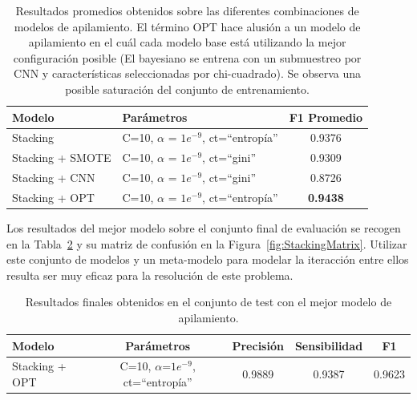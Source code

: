 \documentclass[12pt,letterpaper]{article}
\begin{document}
\begin{table}[htp]
    \centering
    \begin{tabular}{llc}
        \hline
        \textbf{Modelo} & \textbf{Parámetros} &\textbf{F1 Promedio} \\\hline
        Stacking & C=10, $\alpha$ = $1e^{-9}$, ct=``entropía''& 0.9376\\ 
        Stacking + SMOTE & C=10, $\alpha$ = $1e^{-9}$, ct=``gini''& 0.9309 \\ 
        Stacking + CNN & C=10, $\alpha$ = $1e^{-9}$, ct=``gini'' & 0.8726 \\ 
        Stacking + OPT & C=10, $\alpha$ = $1e^{-9}$, ct=``entropía''& \textbf{0.9438} \\ 
        \hline
    \end{tabular}
    \caption{Resultados promedios obtenidos sobre las diferentes combinaciones de modelos de apilamiento. El término OPT hace alusión a un modelo de apilamiento en el cuál cada modelo base está utilizando la mejor configuración posible (El bayesiano se entrena con un submuestreo por CNN y características seleccionadas por chi-cuadrado). Se observa una posible saturación del conjunto de entrenamiento.} 
    \label{tab:StackingResults}
\end{table}

Los resultados del mejor modelo sobre el conjunto final de evaluación se recogen en la Tabla~\ref{tab:StackingFinalResults} y su matriz de confusión en la Figura~\ref{fig:StackingMatrix}.
Utilizar este conjunto de modelos y un meta-modelo para modelar la iteracción entre ellos resulta ser muy eficaz para la resolución de este problema.

\begin{table}[htp]
    \centering
    \begin{tabular}{lcccc}
        \hline
        \textbf{Modelo} & \textbf{Parámetros} &\textbf{Precisión} &\textbf{Sensibilidad} &\textbf{F1} \\\hline
        Stacking + OPT & C=10, $\alpha$=$1e^{-9}$, ct=``entropía'' & 0.9889 & 0.9387 & 0.9623\\ 
        \hline
    \end{tabular}
    \caption{Resultados finales obtenidos en el conjunto de test con el mejor modelo de apilamiento.}
    \label{tab:StackingFinalResults}
\end{table}
\end{document}
